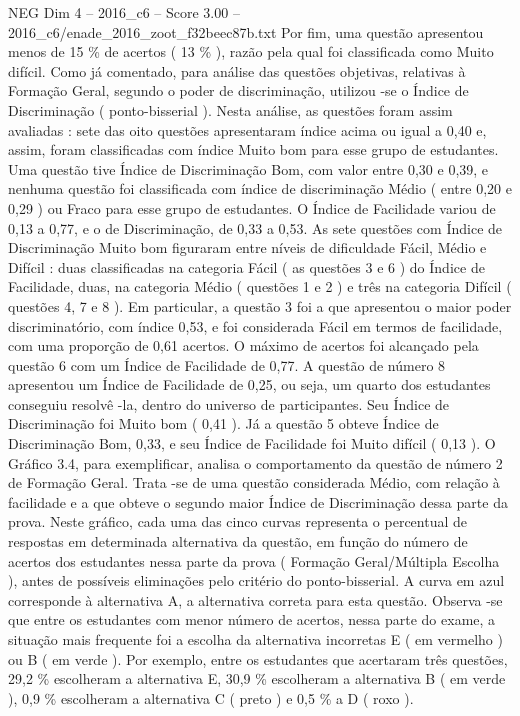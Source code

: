 \begin{textsample}{NEG Dim 4 – 2016\_c6 – Score 3.00 – 2016\_c6/enade\_2016\_zoot\_f32beec87b.txt}
Por fim, uma questão apresentou menos de 15 \% de acertos ( 13 \% ), razão pela qual foi classificada como Muito difícil.
Como já comentado, para análise das questões objetivas, relativas à Formação Geral, segundo o poder de discriminação, utilizou -se o Índice de Discriminação ( ponto-bisserial ).
Nesta análise, as questões foram assim avaliadas : sete das oito questões apresentaram índice acima ou igual a 0,40 e, assim, foram classificadas com índice Muito bom para esse grupo de estudantes.
Uma questão tive Índice de Discriminação Bom, com valor entre 0,30 e 0,39, e nenhuma questão foi classificada com índice de discriminação Médio ( entre 0,20 e 0,29 ) ou Fraco para esse grupo de estudantes.
O Índice de Facilidade variou de 0,13 a 0,77, e o de Discriminação, de 0,33 a 0,53.
As sete questões com Índice de Discriminação Muito bom figuraram entre níveis de dificuldade Fácil, Médio e Difícil : duas classificadas na categoria Fácil ( as questões 3 e 6 ) do Índice de Facilidade, duas, na categoria Médio ( questões 1 e 2 ) e três na categoria Difícil ( questões 4, 7 e 8 ).
Em particular, a questão 3 foi a que apresentou o maior poder discriminatório, com índice 0,53, e foi considerada Fácil em termos de facilidade, com uma proporção de 0,61 acertos.
O máximo de acertos foi alcançado pela questão 6 com um Índice de Facilidade de 0,77.
A questão de número 8 apresentou um Índice de Facilidade de 0,25, ou seja, um quarto dos estudantes conseguiu resolvê -la, dentro do universo de participantes.
Seu Índice de Discriminação foi Muito bom ( 0,41 ).
Já a questão 5 obteve Índice de Discriminação Bom, 0,33, e seu Índice de Facilidade foi Muito difícil ( 0,13 ).
O Gráfico 3.4, para exemplificar, analisa o comportamento da questão de número 2 de Formação Geral.
Trata -se de uma questão considerada Médio, com relação à facilidade e a que obteve o segundo maior Índice de Discriminação dessa parte da prova.
Neste gráfico, cada uma das cinco curvas representa o percentual de respostas em determinada alternativa da questão, em função do número de acertos dos estudantes nessa parte da prova ( Formação Geral/Múltipla Escolha ), antes de possíveis eliminações pelo critério do ponto-bisserial.
A curva em azul corresponde à alternativa A, a alternativa correta para esta questão.
Observa -se que entre os estudantes com menor número de acertos, nessa parte do exame, a situação mais frequente foi a escolha da alternativa incorretas E ( em vermelho ) ou B ( em verde ).
Por exemplo, entre os estudantes que acertaram três questões, 29,2 \% escolheram a alternativa E, 30,9 \% escolheram a alternativa B ( em verde ), 0,9 \% escolheram a alternativa C ( preto ) e 0,5 \% a D ( roxo ).

\end{textsample}
